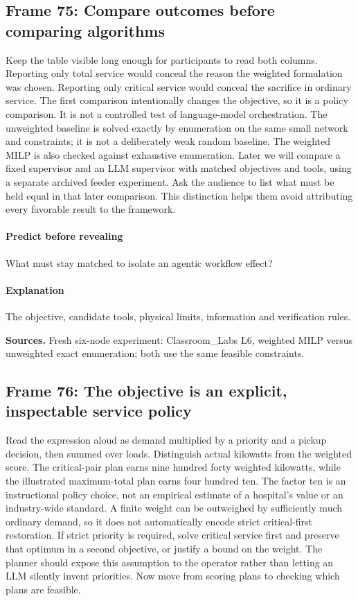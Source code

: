 \documentclass[11pt]{article}
\begin{document}
\subsection*{Frame 75: Compare outcomes before comparing algorithms}
Keep the table visible long enough for participants to read both columns. Reporting only total service would conceal the reason the weighted formulation was chosen. Reporting only critical service would conceal the sacrifice in ordinary service. The first comparison intentionally changes the objective, so it is a policy comparison. It is not a controlled test of language-model orchestration. The unweighted baseline is solved exactly by enumeration on the same small network and constraints; it is not a deliberately weak random baseline. The weighted MILP is also checked against exhaustive enumeration. Later we will compare a fixed supervisor and an LLM supervisor with matched objectives and tools, using a separate archived feeder experiment. Ask the audience to list what must be held equal in that later comparison. This distinction helps them avoid attributing every favorable result to the framework.\par
\paragraph{Predict before revealing}What must stay matched to isolate an agentic workflow effect?
\paragraph{Explanation}The objective, candidate tools, physical limits, information and verification rules.
\par\nopagebreak\begin{minipage}{\linewidth}{\footnotesize\color{slate}\textbf{Sources.} Fresh six-node experiment: Classroom\_Labs L6, weighted MILP versus unweighted exact enumeration; both use the same feasible constraints.\par}\end{minipage}\par\medskip
\subsection*{Frame 76: The objective is an explicit, inspectable service policy}
Read the expression aloud as demand multiplied by a priority and a pickup decision, then summed over loads. Distinguish actual kilowatts from the weighted score. The critical-pair plan earns nine hundred forty weighted kilowatts, while the illustrated maximum-total plan earns four hundred ten. The factor ten is an instructional policy choice, not an empirical estimate of a hospital's value or an industry-wide standard. A finite weight can be outweighed by sufficiently much ordinary demand, so it does not automatically encode strict critical-first restoration. If strict priority is required, solve critical service first and preserve that optimum in a second objective, or justify a bound on the weight. The planner should expose this assumption to the operator rather than letting an LLM silently invent priorities. Now move from scoring plans to checking which plans are feasible.\par
\end{document}

